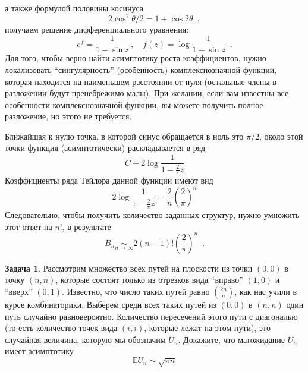 \documentclass[a5paper]{article}
\theoremstyle{definition}
\newtheorem{problem}{Задача}
\begin{document}
а также формулой половины косинуса
\begin{equation}
    2 \cos^2 \theta/2 = 1 + \cos 2 \theta
    \enspace ,
\end{equation}
получаем решение дифференциального уравнения:
\begin{equation}
    e^f = \dfrac{1}{1 - \sin z}
    \, , \quad
    f(z) = \log \dfrac{1}{1 - \sin z}
    \enspace .
\end{equation}
Для того, чтобы верно найти асимптотику роста коэффициентов, нужно локализовать
``сингулярность'' (особенность) комплекснозначной функции, которая находится на
наименьшем расстоянии от нуля (остальные члены в разложении будут пренебрежимо
малы). При желании, если вам известны все особенности комплекснозначной функции,
вы можете получить полное разложение, но этого не требуется.

Ближайшая к нулю точка, в которой синус обращается в ноль это \( \pi / 2
\), около этой точки функция (асимптотически) раскладывается в ряд
\begin{equation}
    C + 2 \log \dfrac{1}{1 - \frac{2}{\pi} z}
\end{equation} 
Коэффициенты ряда Тейлора данной функции имеют вид
\begin{equation}
    [z^n] 2\log \dfrac{1}{1 - \frac{2}{\pi}z} = \dfrac{2}{n} \left( \frac{2}{\pi}
\right)^n 
\end{equation}
Следовательно, чтобы получить количество заданных структур, нужно умножить этот
ответ на \( n! \), в результате
\begin{equation}
    B_n \underset{n \to \infty}\sim 2 (n-1)! \left( \frac{2}{\pi} \right)^n
\enspace .
\end{equation}

\begin{problem}
Рассмотрим множество всех путей на плоскости из точки \( (0,0) \) в точку \(
(n,n) \), которые состоят только из отрезков вида ``вправо'' \( (1,0) \) и ``вверх'' \(
(0,1) \). Известно, что число таких путей равно \( {2n \choose n} \), как нас
учили в курсе комбинаторики. Выберем среди всех таких путей из \( (0,0) \) в \(
(n,n) \) один путь случайно равновероятно. Количество пересечений этого пути с
диагональю (то есть количество точек вида \( (i,i) \), которые лежат на этом
пути), это случайная величина, которую мы обозначим \( U_n \). Докажите, что
матожидание \( U_n \) имеет асимптотику
\begin{equation}
    \mathbb E U_n \sim \sqrt{\pi n}
\end{equation}
\end{problem}
\end{document}
